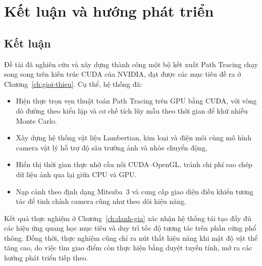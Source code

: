 \chapter{Kết luận và hướng phát triển}
\label{ch:ket-luan}

\section{Kết luận}
Đề tài đã nghiên cứu và xây dựng thành công một bộ kết xuất Path Tracing chạy
song song trên kiến trúc CUDA của NVIDIA, đạt được các mục tiêu đề ra ở
Chương~\ref{ch:gioi-thieu}. Cụ thể, hệ thống đã:
\begin{itemize}[noitemsep]
  \item Hiện thực trọn vẹn thuật toán Path Tracing trên GPU bằng CUDA, với vòng
        dò đường theo kiểu lặp và cơ chế tích lũy mẫu theo thời gian để khử
        nhiễu Monte Carlo.
  \item Xây dựng hệ thống vật liệu Lambertian, kim loại và điện môi cùng mô hình
        camera vật lý hỗ trợ độ sâu trường ảnh và nhòe chuyển động.
  \item Hiển thị thời gian thực nhờ cầu nối CUDA--OpenGL, tránh chi phí sao chép
        dữ liệu ảnh qua lại giữa CPU và GPU.
  \item Nạp cảnh theo định dạng Mitsuba~3 và cung cấp giao diện điều khiển tương
        tác để tinh chỉnh camera cũng như theo dõi hiệu năng.
\end{itemize}

Kết quả thực nghiệm ở Chương~\ref{ch:danh-gia} xác nhận hệ thống tái tạo đầy đủ
các hiệu ứng quang học mục tiêu và duy trì tốc độ tương tác trên phần cứng phổ
thông. Đồng thời, thực nghiệm cũng chỉ ra nút thắt hiệu năng khi mật độ vật thể
tăng cao, do việc tìm giao điểm còn thực hiện bằng duyệt tuyến tính, mở ra các
hướng phát triển tiếp theo.

